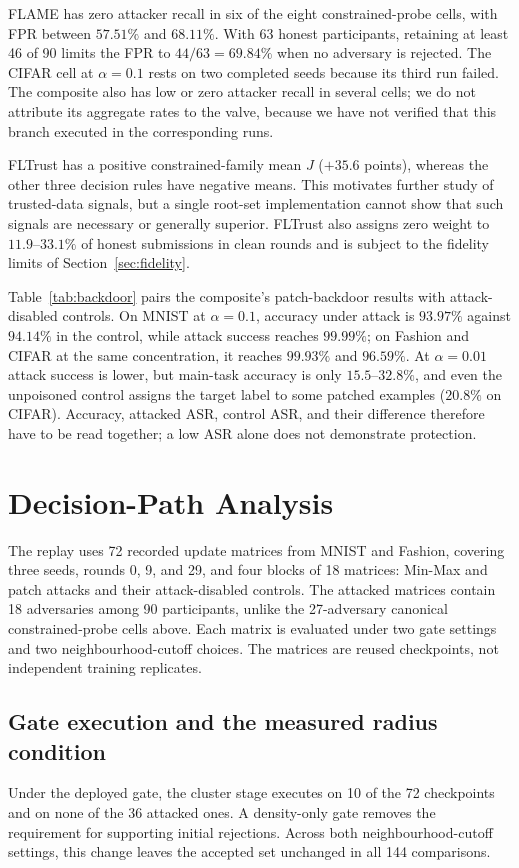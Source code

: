 \documentclass[journal]{IEEEtran}
\begin{document}
FLAME has zero attacker recall in six of the eight constrained-probe cells, with FPR between $57.51\%$ and $68.11\%$. With 63 honest participants, retaining at least 46 of 90 limits the FPR to $44/63=69.84\%$ when no adversary is rejected. The CIFAR cell at $\alpha=0.1$ rests on two completed seeds because its third run failed. The composite also has low or zero attacker recall in several cells; we do not attribute its aggregate rates to the valve, because we have not verified that this branch executed in the corresponding runs.

FLTrust has a positive constrained-family mean $J$ ($+35.6$ points), whereas the other three decision rules have negative means. This motivates further study of trusted-data signals, but a single root-set implementation cannot show that such signals are necessary or generally superior. FLTrust also assigns zero weight to $11.9$--$33.1\%$ of honest submissions in clean rounds and is subject to the fidelity limits of Section~\ref{sec:fidelity}.


Table~\ref{tab:backdoor} pairs the composite's patch-backdoor results with attack-disabled controls. On MNIST at $\alpha=0.1$, accuracy under attack is $93.97\%$ against $94.14\%$ in the control, while attack success reaches $99.99\%$; on Fashion and CIFAR at the same concentration, it reaches $99.93\%$ and $96.59\%$. At $\alpha=0.01$ attack success is lower, but main-task accuracy is only $15.5$--$32.8\%$, and even the unpoisoned control assigns the target label to some patched examples ($20.8\%$ on CIFAR). Accuracy, attacked ASR, control ASR, and their difference therefore have to be read together; a low ASR alone does not demonstrate protection.

\section{Decision-Path Analysis}\label{sec:mechanism}
The replay uses 72 recorded update matrices from MNIST and Fashion, covering three seeds, rounds 0, 9, and 29, and four blocks of 18 matrices: Min-Max and patch attacks and their attack-disabled controls. The attacked matrices contain 18 adversaries among 90 participants, unlike the 27-adversary canonical constrained-probe cells above. Each matrix is evaluated under two gate settings and two neighbourhood-cutoff choices. The matrices are reused checkpoints, not independent training replicates.

\subsection{Gate execution and the measured radius condition}
Under the deployed gate, the cluster stage executes on 10 of the 72 checkpoints and on none of the 36 attacked ones. A density-only gate removes the requirement for supporting initial rejections. Across both neighbourhood-cutoff settings, this change leaves the accepted set unchanged in all 144 comparisons.
\end{document}
